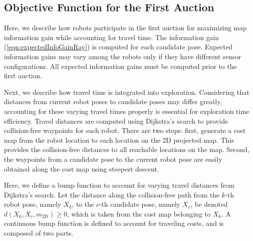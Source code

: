 \documentclass[smallextended]{svjour3}       %
\newcommand{\refeqn}[1]{(\ref{eqn:#1})}
\begin{document}
\subsection{Objective Function for the First Auction}

Here, we describe how robots participate in the first auction for maximizing map information gain while accounting for travel time. The information gain \refeqn{expectedInfoGainRay} is computed for each candidate pose. Expected information gains may vary among the robots only if they have different sensor configurations. All expected information gains must be computed prior to the first auction.

Next, we describe how travel time is integrated into exploration. Considering that distances from current robot poses to candidate poses may differ greatly, accounting for these varying travel times properly is essential for exploration time efficiency. Travel distances are computed using Dijkstra's search to provide collision-free waypoints for each robot. There are two steps: first, generate a cost map from the robot location to each location on the 2D projected map. This provides the collision-free distances to all reachable locations on the map. Second, the waypoints from a candidate pose to the current robot pose are easily obtained along the cost map using steepest descent. 




Here, we define a bump function to account for varying travel distances from Dijkstra's search. Let the distance along the collision-free path from the $k$-th robot pose, namely $X_k$, to the $c$-th candidate pose, namely $X_c$, be denoted $d(X_k,X_c,m_\text{2D})\geq0$, which is taken from the cost map belonging to $X_k$. A continuous bump function is defined to account for traveling costs, and is composed of two parts.  
\end{document}
